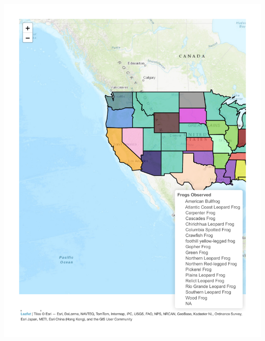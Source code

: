 \documentclass[
  letterpaper,
  DIV=11,
  numbers=noendperiod]{scrartcl}
\begin{document}
\includegraphics{MiniProject1_files/figure-pdf/unnamed-chunk-9-1.pdf}
\end{document}
